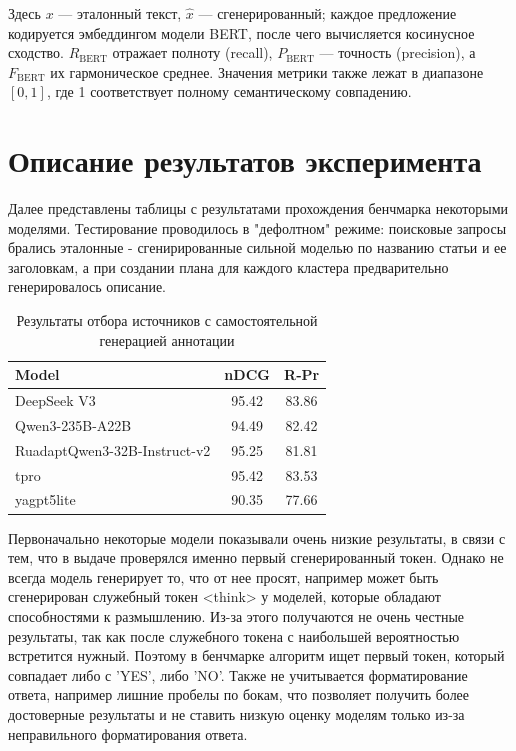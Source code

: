 \documentclass{article}
\theoremstyle{definition}
\theoremstyle{plain}
\begin{document}
Здесь \(x\) — эталонный текст, \(\hat{x}\) — сгенерированный; каждое предложение кодируется эмбеддингом модели BERT, после чего вычисляется косинусное сходство.  
\(R_{\mathrm{BERT}}\) отражает полноту (recall), \(P_{\mathrm{BERT}}\) — точность (precision), а \(F_{\mathrm{BERT}}\) их гармоническое среднее.  
Значения метрики также лежат в диапазоне \([0,1]\), где 1 соответствует полному семантическому совпадению.


\section*{Описание результатов эксперимента}
Далее представлены таблицы с результатами прохождения бенчмарка некоторыми моделями. Тестирование проводилось в "дефолтном" режиме: поисковые запросы брались эталонные - сгенирированные сильной моделью по названию статьи и ее заголовкам, а
при создании плана для каждого кластера предварительно генерировалось описание.

\begin{table}[ht]
\centering
\caption{Результаты отбора источников с самостоятельной генерацией аннотации}
\begin{tabular}{l|c|c}
\hline
\textbf{Model} & \textbf{nDCG} & \textbf{R‑Pr} \\
\hline
DeepSeek V3 & 95.42 & 83.86 \\
Qwen3-235B-A22B & 94.49 & 82.42 \\
RuadaptQwen3-32B-Instruct-v2 & 95.25 & 81.81 \\
tpro & 95.42 & 83.53 \\
yagpt5lite & 90.35 & 77.66 \\
\hline
\end{tabular}
\end{table}

Первоначально некоторые модели показывали очень низкие результаты, в связи с тем, что в выдаче проверялся именно первый сгенерированный токен. Однако не всегда модель генерирует то, что от нее просят, например может быть сгенерирован служебный
токен <think> у моделей, которые обладают способностями к размышлению. Из-за этого получаются не очень честные результаты, так как после служебного токена с наибольшей вероятностью встретится нужный. Поэтому в бенчмарке алгоритм ищет первый токен,
который совпадает либо с 'YES', либо 'NO'. Также не учитывается форматирование ответа, например лишние пробелы по бокам, что позволяет получить более достоверные результаты и не ставить низкую оценку моделям только из-за неправильного форматирования ответа.
\end{document}

